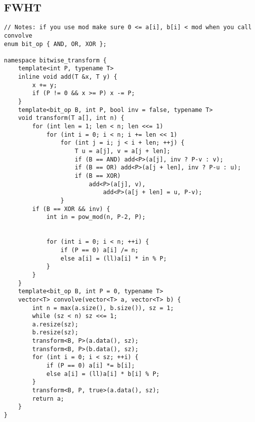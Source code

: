 \documentclass[landscape, 8pt, a4paper, oneside]{extarticle}
\begin{document}
\begin{multicols}{3}
\subsection{FWHT}
\begin{verbatim}
// Notes: if you use mod make sure 0 <= a[i], b[i] < mod when you call convolve
enum bit_op { AND, OR, XOR };

namespace bitwise_transform {
    template<int P, typename T>
    inline void add(T &x, T y) {
        x += y;
        if (P != 0 && x >= P) x -= P;
    }
    template<bit_op B, int P, bool inv = false, typename T>
    void transform(T a[], int n) {
        for (int len = 1; len < n; len <<= 1)
            for (int i = 0; i < n; i += len << 1)
                for (int j = i; j < i + len; ++j) {
                    T u = a[j], v = a[j + len];
                    if (B == AND) add<P>(a[j], inv ? P-v : v);
                    if (B == OR) add<P>(a[j + len], inv ? P-u : u);
                    if (B == XOR)
                        add<P>(a[j], v),
                            add<P>(a[j + len] = u, P-v);
                }
        if (B == XOR && inv) {
            int in = pow_mod(n, P-2, P);


            for (int i = 0; i < n; ++i) {
                if (P == 0) a[i] /= n;
                else a[i] = (ll)a[i] * in % P;
            }
        }
    }
    template<bit_op B, int P = 0, typename T>
    vector<T> convolve(vector<T> a, vector<T> b) {
        int n = max(a.size(), b.size()), sz = 1;
        while (sz < n) sz <<= 1;
        a.resize(sz);
        b.resize(sz);
        transform<B, P>(a.data(), sz);
        transform<B, P>(b.data(), sz);
        for (int i = 0; i < sz; ++i) {
            if (P == 0) a[i] *= b[i];
            else a[i] = (ll)a[i] * b[i] % P;
        }
        transform<B, P, true>(a.data(), sz);
        return a;
    }
}
\end{verbatim}

\end{multicols}
\end{document}
